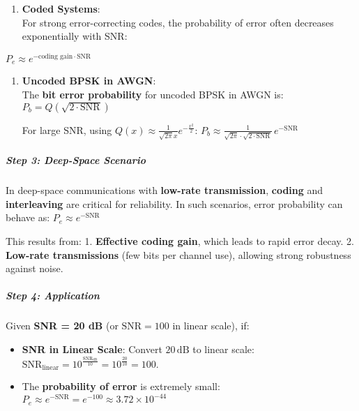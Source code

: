 \documentclass[11pt]{article}
\providecommand{\tightlist}{%
      \setlength{\itemsep}{0pt}\setlength{\parskip}{0pt}}
\begin{document}
\begin{enumerate}
\def\labelenumi{\arabic{enumi}.}
\tightlist
\item
  \textbf{Coded Systems}:\\
  For strong error-correcting codes, the probability of error often
  decreases exponentially with SNR:
\end{enumerate}

\(P_e \approx e^{-\text{coding gain} \cdot \text{SNR}}\)

\begin{enumerate}
\def\labelenumi{\arabic{enumi}.}
\setcounter{enumi}{1}
\item
  \textbf{Uncoded BPSK in AWGN}:\\
  The \textbf{bit error probability} for uncoded BPSK in AWGN is:
  \(P_b = Q\left(\sqrt{2 \cdot \text{SNR}}\right)\)

  For large SNR, using
  \(Q(x) \approx \frac{1}{\sqrt{2\pi} x} e^{-\frac{x^2}{2}}\):
  \(P_b \approx \frac{1}{\sqrt{2\pi} \cdot \sqrt{2 \cdot \text{SNR}}} \, e^{-\text{SNR}}\)
\end{enumerate}

\subparagraph{\texorpdfstring{\textbf{Step 3: Deep-Space
Scenario}}{Step 3: Deep-Space Scenario}}\label{step-3-deep-space-scenario}

In deep-space communications with \textbf{low-rate transmission},
\textbf{coding} and \textbf{interleaving} are critical for reliability.
In such scenarios, error probability can behave as:
\(P_e \approx e^{-\text{SNR}}\)

This results from: 1. \textbf{Effective coding gain}, which leads to
rapid error decay. 2. \textbf{Low-rate transmissions} (few bits per
channel use), allowing strong robustness against noise.

\subparagraph{\texorpdfstring{\textbf{Step 4:
Application}}{Step 4: Application}}\label{step-4-application}

Given \textbf{SNR = 20 dB} (or \(\text{SNR} = 100\) in linear scale),
if:

\begin{itemize}
\item
  \textbf{SNR in Linear Scale}: Convert \(20 \, \text{dB}\) to linear
  scale:
  \(\boxed{\text{SNR}_{\text{linear}} = 10^{\frac{\text{SNR}_{\text{dB}}}{10}} = 10^{\frac{20}{10}} = 100}.\)
\item
  The \textbf{probability of error} is extremely small:
  \(\boxed{P_e \approx e^{-\text{SNR}} = e^{-100} \approx 3.72 \times 10^{-44}}\)
\end{itemize}
\end{document}

